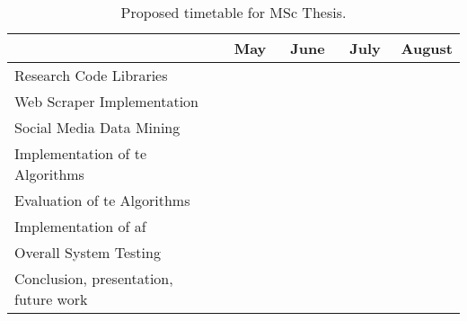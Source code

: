 \begin{table}[!htbp]
    \centering
    \caption{Proposed timetable for MSc Thesis.}
    \begin{tabular}{|l|c|c|c|c|c|c|c|c|c|c|c|c|c|c|c|c|}
        \toprule
        & \multicolumn{4}{c|}{May} & \multicolumn{4}{c|}{June} & \multicolumn{4}{c|}{July} & \multicolumn{4}{c|}{August} \\ 
        \midrule
        
        Research Code Libraries & \multicolumn{2}{c|}{\cellcolor{brown}} & & & & & & & & & & & & & & \\
        \hline
        Web Scraper Implementation & & & \multicolumn{2}{c|}{\cellcolor{blue}} & & & & & & & & & & & & \\
        \hline
        
        Social Media Data Mining & & & & & \multicolumn{3}{c|}{\cellcolor{orange}} & & & & & & & & & \\
        \hline
        
        Implementation of \gls{te} Algorithms & & & & & & & & \multicolumn{2}{c|}{\cellcolor{green}} & & & & & & & \\
        \hline
        
        Evaluation of \gls{te} Algorithms & & & & & & & & & & \cellcolor{red} & & & & & & \\
        \hline
        
        Implementation of \gls{af} & & & & & & & & & & & \multicolumn{2}{c|}{\cellcolor{gray}} & & & & \\
        \hline
        
        Overall System Testing & & & & & & & & & & & & & \cellcolor{yellow} & & & \\
        \hline
        
        Conclusion, presentation, future work & & & & & & & & & & & & & & \multicolumn{2}{c|}{\cellcolor{purple}} & \\
        \bottomrule
    \end{tabular}
    \label{table:timetable}
\end{table}